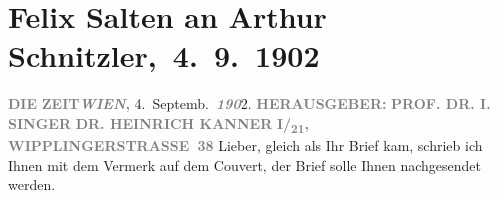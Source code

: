 

         
         \renewcommand{\erwaehntePersonen}{Personen: Heinrich Kanner, Felix Salten, Isidor Singer}
         \renewcommand{\erwaehnteInstitutionen}{Institutionen: Die Zeit}
         \renewcommand{\erwaehnteOrte}{Orte: Wien, Wipplingerstraße}
         \renewcommand{\erwaehnteWerke}{Werke: Die griechische Tänzerin. Novellette, Die kleine Veronika}
               \section[ Felix Salten an Arthur Schnitzler, 4. 9. 1902]{ Felix Salten an Arthur Schnitzler, 4. 9. 1902}\nopagebreak{}\rehead{ }\begin{ledgroupsized}[t]{13cm}\normalsize\beginnumbering \toendnotes[C]{\smallbreak\pagebreak[2]} 
\toendnotes[C]{\smallbreak}\pstart
           \noindent{}{\pb}\textcolor{gray}{\textbf{DIE}}\pend
           \pstart
           \textcolor{gray}{\textbf{ZEIT}}\hfill \textcolor{gray}{\textbf{\emph{WIEN},}}{ }4. Septemb. \textcolor{gray}{\textbf{\emph{190}}}2.\pend
           \pstart
           \textcolor{gray}{\textbf{\textsc{\textbf{}}}}\pend
           \pstart
           \textcolor{gray}{\textbf{HERAUSGEBER:}}\pend
           \pstart
           \textcolor{gray}{\textbf{\textbf{PROF. DR. I. SINGER}}}\pend
           \pstart
           \textcolor{gray}{\textbf{\textbf{DR. HEINRICH KANNER}}}\pend
           \pstart
           \textcolor{gray}{\textbf{\textbf{}}}\pend
           \pstart
           \textcolor{gray}{\textbf{I/\textsubscript{21},
                           WIPPLINGERSTRASSE 38}}\pend
           \pstart
           Lieber, gleich als Ihr Brief kam, schrieb ich Ihnen
               mit dem Vermerk auf dem Couvert, der Brief solle Ihnen nachgesendet werden.

\end{ledgroupsized}
